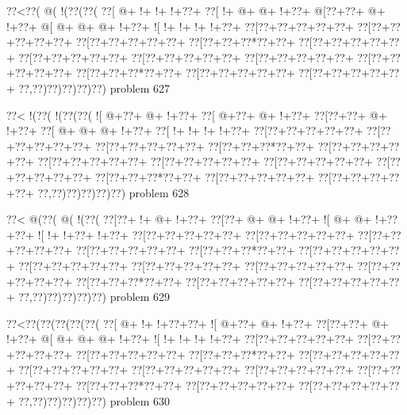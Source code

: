 \vbox{\vbox{\goo
\0??<\0??(\- @(\- !(\0??(\0??(
\0??[\- @+\- !+\- !+\- !+\0??+
\0??[\- !+\- @+\- @+\- !+\0??+
\- @[\0??+\0??+\- @+\- !+\0??+
\- @[\- @+\- @+\- @+\- !+\0??+
\- ![\- !+\- !+\- !+\- !+\0??+
\0??[\0??+\0??+\0??+\0??+\0??+
\0??[\0??+\0??+\0??+\0??+\0??+
\0??[\0??+\0??+\0??+\0??+\0??+
\0??[\0??+\0??+\0??*\0??+\0??+
\0??[\0??+\0??+\0??+\0??+\0??+
\0??[\0??+\0??+\0??+\0??+\0??+
\0??[\0??+\0??+\0??+\0??+\0??+
\0??[\0??+\0??+\0??+\0??+\0??+
\0??[\0??+\0??+\0??+\0??+\0??+
\0??[\0??+\0??+\0??*\0??+\0??+
\0??[\0??+\0??+\0??+\0??+\0??+
\0??[\0??+\0??+\0??+\0??+\0??+
\0??,\0??)\0??)\0??)\0??)\0??)
}
\hfil problem 627\hfil\break
}

\vbox{\vbox{\goo
\0??<\- !(\0??(\- !(\0??(\0??(
\- ![\- @+\0??+\- @+\- !+\0??+
\0??[\- @+\0??+\- @+\- !+\0??+
\0??[\0??+\0??+\- @+\- !+\0??+
\0??[\- @+\- @+\- @+\- !+\0??+
\0??[\- !+\- !+\- !+\- !+\0??+
\0??[\0??+\0??+\0??+\0??+\0??+
\0??[\0??+\0??+\0??+\0??+\0??+
\0??[\0??+\0??+\0??+\0??+\0??+
\0??[\0??+\0??+\0??*\0??+\0??+
\0??[\0??+\0??+\0??+\0??+\0??+
\0??[\0??+\0??+\0??+\0??+\0??+
\0??[\0??+\0??+\0??+\0??+\0??+
\0??[\0??+\0??+\0??+\0??+\0??+
\0??[\0??+\0??+\0??+\0??+\0??+
\0??[\0??+\0??+\0??*\0??+\0??+
\0??[\0??+\0??+\0??+\0??+\0??+
\0??[\0??+\0??+\0??+\0??+\0??+
\0??,\0??)\0??)\0??)\0??)\0??)
}
\hfil problem 628\hfil\break
}

\vbox{\vbox{\goo
\0??<\- @(\0??(\- @(\- !(\0??(
\0??[\0??+\- !+\- @+\- !+\0??+
\0??[\0??+\- @+\- @+\- !+\0??+
\- ![\- @+\- @+\- !+\0??+\0??+
\- ![\- !+\- !+\0??+\- !+\0??+
\0??[\0??+\0??+\0??+\0??+\0??+
\0??[\0??+\0??+\0??+\0??+\0??+
\0??[\0??+\0??+\0??+\0??+\0??+
\0??[\0??+\0??+\0??+\0??+\0??+
\0??[\0??+\0??+\0??*\0??+\0??+
\0??[\0??+\0??+\0??+\0??+\0??+
\0??[\0??+\0??+\0??+\0??+\0??+
\0??[\0??+\0??+\0??+\0??+\0??+
\0??[\0??+\0??+\0??+\0??+\0??+
\0??[\0??+\0??+\0??+\0??+\0??+
\0??[\0??+\0??+\0??*\0??+\0??+
\0??[\0??+\0??+\0??+\0??+\0??+
\0??[\0??+\0??+\0??+\0??+\0??+
\0??,\0??)\0??)\0??)\0??)\0??)
}
\hfil problem 629\hfil\break
}

\vbox{\vbox{\goo
\0??<\0??(\0??(\0??(\0??(\0??(
\0??[\- @+\- !+\- !+\0??+\0??+
\- ![\- @+\0??+\- @+\- !+\0??+
\0??[\0??+\0??+\- @+\- !+\0??+
\- @[\- @+\- @+\- @+\- !+\0??+
\- ![\- !+\- !+\- !+\- !+\0??+
\0??[\0??+\0??+\0??+\0??+\0??+
\0??[\0??+\0??+\0??+\0??+\0??+
\0??[\0??+\0??+\0??+\0??+\0??+
\0??[\0??+\0??+\0??*\0??+\0??+
\0??[\0??+\0??+\0??+\0??+\0??+
\0??[\0??+\0??+\0??+\0??+\0??+
\0??[\0??+\0??+\0??+\0??+\0??+
\0??[\0??+\0??+\0??+\0??+\0??+
\0??[\0??+\0??+\0??+\0??+\0??+
\0??[\0??+\0??+\0??*\0??+\0??+
\0??[\0??+\0??+\0??+\0??+\0??+
\0??[\0??+\0??+\0??+\0??+\0??+
\0??,\0??)\0??)\0??)\0??)\0??)
}
\hfil problem 630\hfil\break
}

